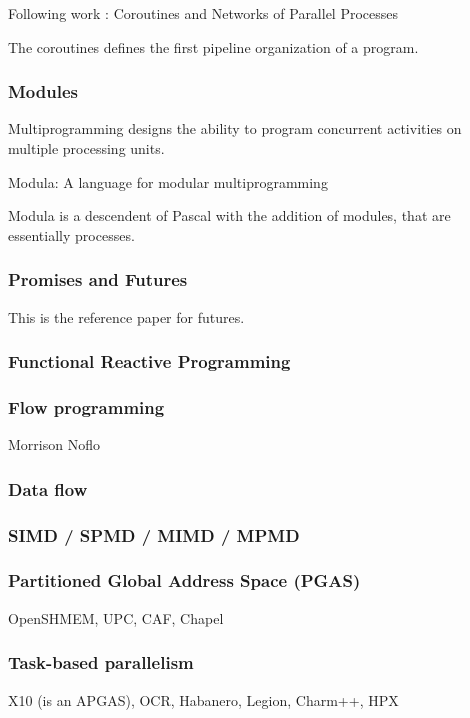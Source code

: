 Following work : Coroutines and Networks of Parallel Processes\cite{Kahn1976}

The coroutines defines the first pipeline organization of a program.

\subsubsection{Modules}

Multiprogramming designs the ability to program concurrent activities on multiple processing units.

Modula: A language for modular multiprogramming \cite{Wirth1977}

Modula is a descendent of Pascal with the addition of modules, that are essentially processes.


\subsubsection{Promises and Futures}

This \cite{Jr1977} is the reference paper for futures.

\subsubsection{Functional Reactive Programming}

\subsubsection{Flow programming}
Morrison
Noflo

\subsubsection{Data flow}


\subsubsection{SIMD / SPMD / MIMD / MPMD}

\subsubsection{Partitioned Global Address Space (PGAS)}
OpenSHMEM, UPC, CAF, Chapel


\subsubsection{Task-based parallelism}
X10 (is an APGAS), OCR, Habanero, Legion, Charm++, HPX

